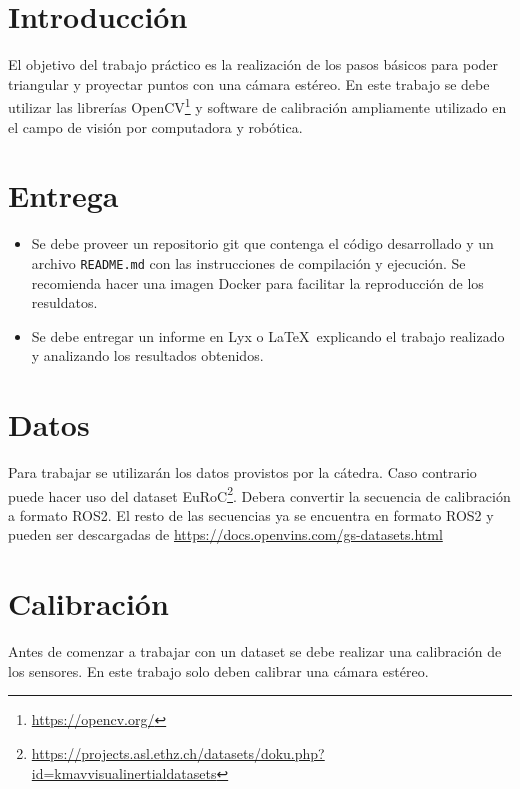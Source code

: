 \documentclass[tp]{lcc}
\begin{document}
\maketitle

\section{Introducción}

El objetivo del trabajo práctico es la realización de los pasos básicos para poder triangular y proyectar puntos con una cámara estéreo. En este trabajo se debe utilizar  las librerías OpenCV\footnote{\url{https://opencv.org/}} y software de calibración ampliamente utilizado en el campo de visión por computadora y robótica.


\section{Entrega}
\begin{itemize}
	\item Se debe proveer un repositorio git que contenga el código desarrollado y un archivo \lstinline{README.md} con las instrucciones de compilación y ejecución. Se recomienda hacer una imagen Docker para facilitar la reproducción de los resuldatos.
    
	\item Se debe entregar un informe en Lyx o \LaTeX\  explicando el trabajo realizado y analizando los resultados obtenidos.
\end{itemize}

\section{Datos}
Para trabajar se utilizarán los datos provistos por la cátedra. Caso contrario puede hacer uso del dataset EuRoC\footnote{\url{https://projects.asl.ethz.ch/datasets/doku.php?id=kmavvisualinertialdatasets}}. Debera convertir la secuencia de calibración a formato ROS2. El resto de las secuencias ya se encuentra en formato ROS2 y pueden ser descargadas de \url{https://docs.openvins.com/gs-datasets.html}

\section{Calibración}
Antes de comenzar a trabajar con un dataset se debe realizar una calibración de los sensores. En este trabajo solo deben calibrar una cámara estéreo.
\end{document}
